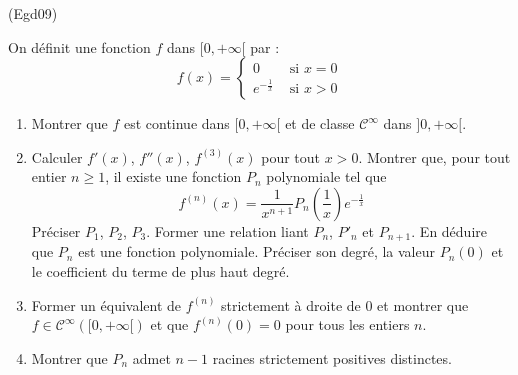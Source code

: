 \begin{tiny}(Egd09)\end{tiny}
On définit une fonction $f$ dans $[0,+\infty[$ par :
\begin{displaymath}
 f(x) = \left\lbrace \begin{aligned} 
0 &\text{ si } x=0 \\
e^{-\frac{1}{x}} &\text{ si } x>0
\end{aligned}
\right. 
\end{displaymath}
\begin{enumerate}
 \item Montrer que $f$ est continue dans $[0,+\infty[$ et de classe $\mathcal C^\infty$ dans $]0,+\infty[$.
\item Calculer $f'(x)$, $f''(x)$, $f^{(3)}(x)$ pour tout $x>0$. Montrer que, pour tout entier $n\geq1$, il existe une fonction $P_n$ polynomiale tel que 
\begin{displaymath}
 f^{(n)}(x) = \dfrac{1}{x^{n+1}}P_n(\dfrac{1}{x})e^{-\frac{1}{x}}
\end{displaymath}
Préciser $P_1$, $P_2$, $P_3$. Former une relation liant $P_n$, $P'_n$ et $P_{n+1}$. En déduire que $P_n$ est une fonction polynomiale. Préciser son degré, la valeur $P_n(0)$ et le coefficient du terme de plus haut degré.
\item Former un équivalent de $f^{(n)}$ strictement à droite de $0$ et montrer que $f\in \mathcal C^\infty([0,+\infty[)$ et que $f^{(n)}(0)=0$ pour tous les entiers $n$.
\item Montrer que $P_n$ admet $n-1$ racines strictement positives distinctes.
\end{enumerate}
